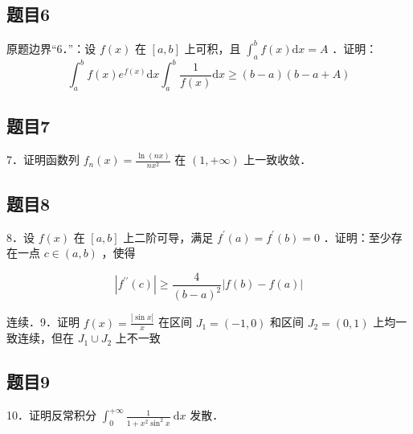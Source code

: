 \documentclass{article}
\begin{document}
\subsection{题目6}
原题边界“6．”：设 \(f(x)\) 在 \([a, b]\) 上可积，且 \(\int_{a}^{b} f(x) \mathrm{d} x=A\) ．证明：
\[
\int_{a}^{b} f(x) e^{f(x)} \mathrm{d} x \int_{a}^{b} \frac{1}{f(x)} \mathrm{d} x \geq(b-a)(b-a+A)
\]

\subsection{题目7}
7．证明函数列 \(f_{n}(x)=\frac{\ln (n x)}{n x^{2}}\) 在 \((1,+\infty)\) 上一致收敛．

\subsection{题目8}
8．设 \(f(x)\) 在 \([a, b]\) 上二阶可导，满足 \(f^{\prime}(a)=f^{\prime}(b)=0\) ．证明：至少存在一点 \(c \in(a, b)\) ，使得

\[
\left|f^{\prime \prime}(c)\right| \geq \frac{4}{(b-a)^{2}}|f(b)-f(a)|
\]

连续．9．证明 \(f(x)=\frac{|\sin x|}{x}\) 在区间 \(J_{1}=(-1,0)\) 和区间 \(J_{2}=(0,1)\) 上均一致连续，但在 \(J_{1} \cup J_{2}\) 上不一致\\

\subsection{题目9}
10．证明反常积分 \(\int_{0}^{+\infty} \frac{1}{1+x^{2} \sin ^{2} x} \mathrm{~d} x\) 发散．
\end{document}
